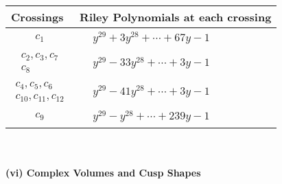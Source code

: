 \documentclass[1p]{elsarticle_modified}
\theoremstyle{definition}
\begin{document}
\begin{tabular}{m{50pt}|m{274pt}}
Crossings & \hspace{64pt}Riley Polynomials at each crossing \\
\hline $$\begin{aligned}c_{1}\end{aligned}$$&$\begin{aligned}
&y^{29}+3 y^{28}+\cdots+67 y-1
\end{aligned}$\\
\hline $$\begin{aligned}c_{2},c_{3},c_{7}\\c_{8}\end{aligned}$$&$\begin{aligned}
&y^{29}-33 y^{28}+\cdots+3 y-1
\end{aligned}$\\
\hline $$\begin{aligned}c_{4},c_{5},c_{6}\\c_{10},c_{11},c_{12}\end{aligned}$$&$\begin{aligned}
&y^{29}-41 y^{28}+\cdots+3 y-1
\end{aligned}$\\
\hline $$\begin{aligned}c_{9}\end{aligned}$$&$\begin{aligned}
&y^{29}- y^{28}+\cdots+239 y-1
\end{aligned}$\\
\hline
\end{tabular}\\~\\
\newpage\flushleft \textbf{(vi) Complex Volumes and Cusp Shapes}
\end{document}
